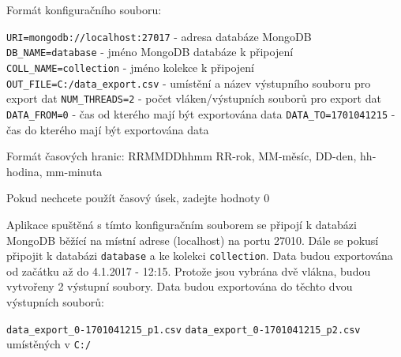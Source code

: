 \setlength{\leftskip}{0cm}
\noindent
Formát konfiguračního souboru:

\setlength{\leftskip}{1cm}
\noindent
\texttt{URI=mongodb://localhost:27017} - adresa databáze MongoDB \newline
\texttt{DB\_NAME=database} - jméno MongoDB databáze k připojení \newline
\texttt{COLL\_NAME=collection} - jméno kolekce k připojení \newline
\texttt{OUT\_FILE=C:/data\_export.csv} - umístění a název výstupního souboru pro export dat \newline
\texttt{NUM\_THREADS=2} - počet vláken/výstupních souborů pro export dat \newline
\texttt{DATA\_FROM=0} - čas od kterého mají být exportována data \newline
\texttt{DATA\_TO=1701041215} - čas do kterého mají být exportována data \newline

\setlength{\leftskip}{1.5cm}
\noindent
Formát časových hranic: \hspace{0.2cm} RRMMDDhhmm RR-rok, MM-měsíc, DD-den, hh-hodina, mm-minuta                     

\noindent
Pokud nechcete použít časový úsek, zadejte hodnoty 0

\setlength{\leftskip}{1cm}
\noindent 
Aplikace spuštěná s tímto konfiguračním souborem se připojí k databázi MongoDB běžící na místní adrese (localhost) na portu 27010. Dále se pokusí připojit k databázi \texttt{database} a ke kolekci \texttt{collection}. Data budou exportována od začátku až do 4.1.2017 - 12:15. Protože jsou vybrána dvě vlákna, budou vytvořeny 2 výstupní soubory. Data budou exportována do těchto dvou výstupních souborů:

\setlength{\leftskip}{2cm}
\noindent 
\texttt{data\_export\_0-1701041215\_p1.csv} \newline
\texttt{data\_export\_0-1701041215\_p2.csv} \newline
umístěných v \texttt{C:/}